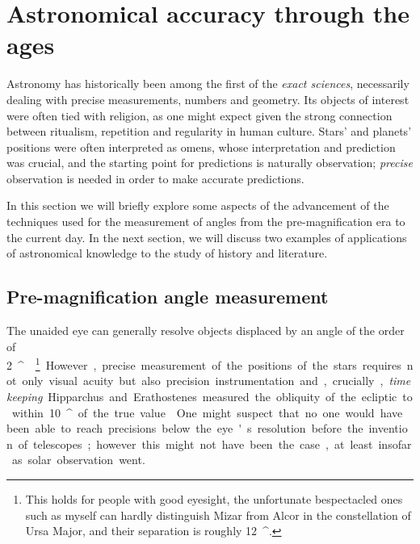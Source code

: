 \documentclass[main.tex]{subfiles}
\begin{document}
\section{Astronomical accuracy through the ages}

Astronomy has historically been among the first of the \emph{exact sciences}, necessarily dealing with precise measurements, numbers and geometry.
Its objects of interest were often tied with religion, as one might expect given the strong connection between ritualism, repetition and regularity in human culture.
Stars' and planets' positions were often interpreted as omens, whose interpretation and prediction was crucial, and the starting point for predictions is naturally observation; \emph{precise} observation is needed in order to make accurate predictions. 

In this section we will briefly explore some aspects of the advancement of the techniques used for the measurement of angles from the pre-magnification era to the current day.
In the next section, we will discuss two examples of applications of astronomical knowledge to the study of history and literature. 

\subsection{Pre-magnification angle measurement}

The unaided eye can generally resolve objects displaced by an angle of the order of \SI{2}{^\prime} \cite[pag.\ 56]{karttunenObservationsInstruments2017}.\footnote{This holds for people with good eyesight, the unfortunate bespectacled ones such as myself can hardly distinguish Mizar from Alcor in the constellation of Ursa Major, and their separation is roughly \SI{12}{^\prime}. }
However, precise measurement of the positions of the stars requires not only visual acuity but also precision instrumentation and, crucially, \emph{timekeeping}. 

Hipparchus and Erathostenes measured the obliquity of the ecliptic to within \SI{10}{^\prime} of the true value \cite[pag.\ 109]{northCosmosIllustratedHistory2008}. 

One might suspect that no one would have been able to reach precisions below the eye's resolution before the invention of telescopes; however this might not have been the case, at least insofar as solar observation went.
\end{document}
